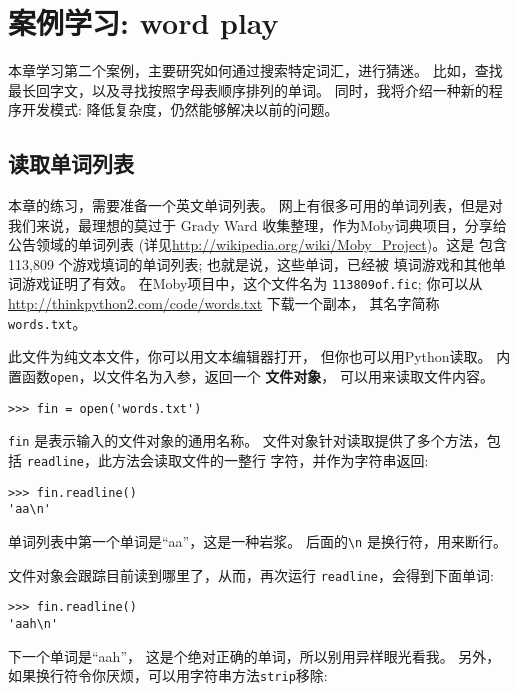 \documentclass[10pt]{book}
\begin{document}
\chapter{案例学习: word play}
\label{wordplay}

本章学习第二个案例，主要研究如何通过搜索特定词汇，进行猜迷。
比如，查找最长回字文，以及寻找按照字母表顺序排列的单词。
同时，我将介绍一种新的程序开发模式: 降低复杂度，仍然能够解决以前的问题。


\section{读取单词列表}
\label{wordlist}
本章的练习，需要准备一个英文单词列表。
网上有很多可用的单词列表，但是对我们来说，最理想的莫过于
Grady Ward 收集整理，作为Moby词典项目，分享给公告领域的单词列表
(详见\url{http://wikipedia.org/wiki/Moby_Project})。这是
包含113,809 个游戏填词的单词列表; 也就是说，这些单词，已经被
填词游戏和其他单词游戏证明了有效。
在Moby项目中，这个文件名为 {\tt 113809of.fic};
你可以从\url{http://thinkpython2.com/code/words.txt} 下载一个副本，
其名字简称 {\tt words.txt}。

此文件为纯文本文件，你可以用文本编辑器打开，
但你也可以用Python读取。
内置函数{\tt open}，以文件名为入参，返回一个 {\bf 文件对象}，
可以用来读取文件内容。

\begin{verbatim}
>>> fin = open('words.txt')
\end{verbatim}
%
{\tt fin} 是表示输入的文件对象的通用名称。
文件对象针对读取提供了多个方法，包括 {\tt readline}，此方法会读取文件的一整行
字符，并作为字符串返回: 

\begin{verbatim}
>>> fin.readline()
'aa\n'
\end{verbatim}
%
单词列表中第一个单词是``aa''，这是一种岩浆。
后面的\verb"\n" 是换行符，用来断行。

文件对象会跟踪目前读到哪里了，从而，再次运行
{\tt readline}，会得到下面单词:

\begin{verbatim}
>>> fin.readline()
'aah\n'
\end{verbatim}
%
下一个单词是``aah''， 这是个绝对正确的单词，所以别用异样眼光看我。
另外，如果换行符令你厌烦，可以用字符串方法{\tt strip}移除:
\end{document}
